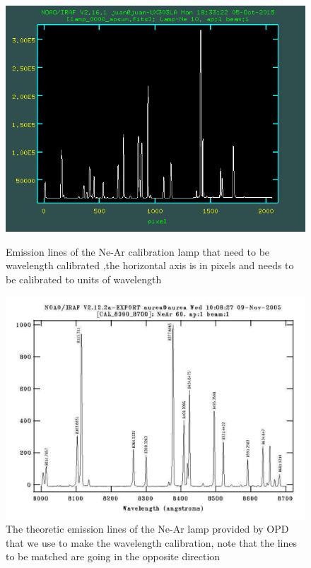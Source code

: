 \begin{figure}[H]
  \centering
  \begin{minipage}[b]{0.45\textwidth}
    \includegraphics[width=\textwidth]{images/lamp_day1_2.png}
    \caption[Emission lines for the Ne-Ar calibration lamp]{Emission lines of the Ne-Ar calibration lamp that need to be wavelength calibrated ,the horizontal axis is in pixels and needs to be calibrated to units of wavelength}
  \end{minipage}
  \hfill
  \begin{minipage}[b]{0.45\textwidth}
    \includegraphics[width=\textwidth]{images/lamp1.png}
    \caption[Theoric emisison lines of a Ne-Ar lamp]{The theoretic emission lines of the Ne-Ar lamp provided by OPD that we use to make the wavelength calibration, note that the lines to be matched are going in the opposite direction}
  \end{minipage}
\end{figure}


